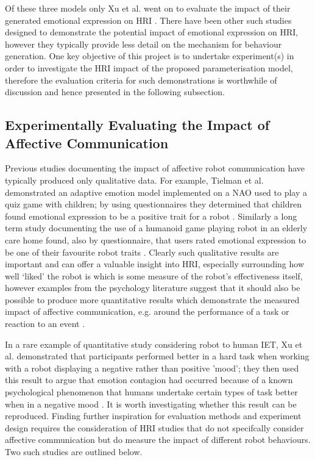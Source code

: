 \documentclass[11pt]{article}
\begin{document}
Of these three models only Xu et al. went on to evaluate the impact of their generated emotional expression on HRI \cite{xu2014robot}. There have been other such studies designed to demonstrate the potential impact of emotional expression on HRI, however they typically provide less detail on the mechanism for behaviour generation. One key objective of this project is to undertake experiment(s) in order to investigate the HRI impact of the proposed parameterisation model, therefore the evaluation criteria for such demonstrations is worthwhile of discussion and hence presented in the following subsection.

\subsection{Experimentally Evaluating the Impact of Affective Communication}

Previous studies documenting the impact of affective robot communication have typically produced only qualitative data. For example, Tielman et al. demonstrated an adaptive emotion model implemented on a NAO used to play a quiz game with children; by using questionnaires they determined that children found emotional expression to be a positive trait for a robot \cite{tielman2014adaptive}. Similarly a long term study documenting the use of a humanoid game playing robot in an elderly care home found, also by questionnaire, that users rated emotional expression to be one of their favourite robot traits \cite{louie2012playing}. Clearly such qualitative results are important and can offer a valuable insight into HRI, especially surrounding how well `liked' the robot is which is some measure of the robot's effectiveness itself, however examples from the psychology literature suggest that it should also be possible to produce more quantitative results which demonstrate the measured impact of affective communication, e.g. around the performance of a task \cite{barsade2002ripple} or reaction to an event \cite{latane1968group}.

In a rare example of quantitative study considering robot to human IET, Xu et al. demonstrated that participants performed better in a hard task when working with a robot displaying a negative rather than positive 'mood'; they then used this result to argue that emotion  contagion had occurred because of a known psychological phenomenon that humans undertake certain types of task better when in a negative mood \cite{xu2014robot}. It is worth investigating whether this result can be reproduced. Finding further inspiration for evaluation methods and experiment design requires the consideration of HRI studies that do not specifcally consider affective communication but do measure the impact of different robot behaviours. Two such studies are outlined below.
\end{document}
